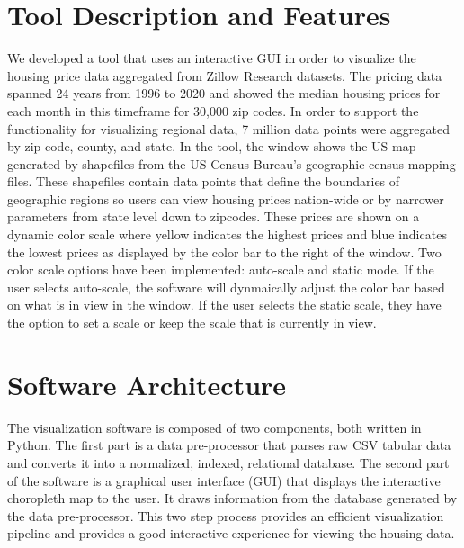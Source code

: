 \documentclass{article}
\begin{document}
\section{Tool Description and Features}
We developed a tool that uses an interactive GUI in order to visualize the housing price data aggregated from Zillow Research datasets. The
pricing data spanned 24 years from 1996 to 2020 and showed the median housing prices for each month in this timeframe for 30,000 zip codes. In order to support the
functionality for visualizing regional data, 7 million data points were aggregated by zip code, county, and state. In the tool, the window
shows the US map generated by shapefiles from the US Census Bureau's geographic census mapping files. These shapefiles contain data points that define the
boundaries of geographic regions so users can view housing prices nation-wide or by narrower parameters from state level down to zipcodes. These prices are shown
on a dynamic color scale where yellow indicates the highest prices and blue indicates the lowest prices as displayed by the color bar to the right of the window.
Two color scale options have been implemented: auto-scale and static mode. If the user selects auto-scale, the software will dynmaically adjust the color bar based
on what is in view in the window. If the user selects the static scale, they have the option to set a scale or keep the scale that is currently in view. 


\section{Software Architecture}
The visualization software is composed of two components, both written in Python. The first 
part is a data pre-processor that parses raw CSV tabular data and converts it into
a normalized, indexed, relational database. The second part of the software is a graphical user interface (GUI) that 
displays the interactive choropleth map to the user. It draws information 
from the database generated by the data pre-processor. This two step process provides an
efficient visualization pipeline and provides a good interactive experience for viewing the housing data.
\end{document}
